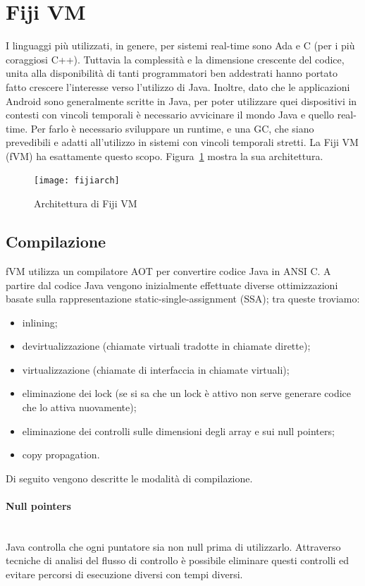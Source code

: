 \section{Fiji VM}
I linguaggi più utilizzati, in genere, per sistemi real-time sono Ada e C (per i più coraggiosi C++). Tuttavia la complessità e la dimensione crescente del codice, unita alla disponibilità di tanti programmatori ben addestrati hanno portato fatto crescere l'interesse verso l'utilizzo di Java. Inoltre, dato che le applicazioni Android sono generalmente scritte in Java, per poter utilizzare quei dispositivi in contesti con vincoli temporali è necessario avvicinare il mondo Java e quello real-time. Per farlo è necessario sviluppare un runtime, e una GC, che siano prevedibili e adatti all'utilizzo in sistemi con vincoli temporali stretti. La Fiji VM (fVM) ha esattamente questo scopo. Figura~\ref{fig:fijiarch} mostra la sua architettura.
\begin{figure}[h]
	\centering
	\texttt{[image: fijiarch]}
	\caption[Architettura di Fiji VM]{Architettura di Fiji VM}
	\label{fig:fijiarch}
\end{figure}

\subsection{Compilazione}
fVM utilizza un compilatore AOT per convertire codice Java in ANSI C. A partire dal codice Java vengono inizialmente effettuate diverse ottimizzazioni basate sulla rappresentazione static-single-assignment (SSA); tra queste troviamo:
\begin{itemize}
	\item inlining;
	\item devirtualizzazione (chiamate virtuali tradotte in chiamate dirette);
	\item virtualizzazione (chiamate di interfaccia in chiamate virtuali);
	\item eliminazione dei lock (se si sa che un lock è attivo non serve generare codice che lo attiva nuovamente);
	\item eliminazione dei controlli sulle dimensioni degli array e sui null pointers;
	\item copy propagation.
\end{itemize}
Di seguito vengono descritte le modalità di compilazione.

\paragraph{Null pointers} \mbox{} \\
Java controlla che ogni puntatore sia non null prima di utilizzarlo. Attraverso tecniche di analisi del flusso di controllo è possibile eliminare questi controlli ed evitare percorsi di esecuzione diversi con tempi diversi.

